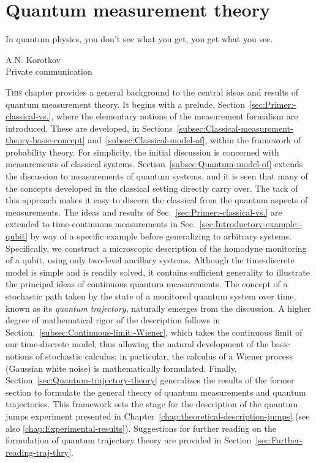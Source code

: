 
\chapter{Quantum measurement theory\label{chap:Quantum-Trajectory-Theory}}


\singlespacing 
\epigraph{
In quantum physics, you don't see what you get, you get what you see.}
{A.N. Korotkov\\Private communication} 
\doublespacing\noindent\lettrine{T}{his} chapter provides a general background
to the central ideas and results of quantum measurement theory. It
begins with a prelude, Section~\ref{sec:Primer:-classical-vs.},
where the elementary notions of the measurement formalism are introduced.
These are developed, in Sections~\ref{subsec:Classical-measurement-theory-basic-concept}
and~\ref{subsec:Classical-model-of}, within the framework of probability
theory. For simplicity, the initial discussion is concerned with measurements
of classical systems. Section~\ref{subsec:Quantum-model-of} extends
the discussion to measurements of quantum systems, and it is seen
that many of the concepts developed in the classical setting directly
carry over. The tack of this approach makes it easy to discern the
classical from the quantum aspects of measurements. The ideas and
results of Sec.~\ref{sec:Primer:-classical-vs.} are extended to
time-continuous measurements in Sec.~\ref{sec:Introductory-example:-qubit}
by way of a specific example before generalizing to arbitrary systems.
Specifically, we construct a microscopic description of the homodyne
monitoring of a qubit, using only two-level ancillary systems. Although
the time-discrete model is simple and is readily solved, it contains
sufficient generality to illustrate the principal ideas of continuous
quantum measurements. The concept of a stochastic path taken by the
state of a monitored quantum system over time, known as its\emph{
quantum trajectory}, naturally emerges from the discussion. A higher
degree of mathematical rigor of the description follows in Section.~\ref{subsec:Continuous-limit:-Wiener},
which takes the continuous limit of our time-discrete model, thus
allowing the natural development of the basic notions of stochastic
calculus; in particular, the calculus of a Wiener process (Gaussian
white noise) is mathematically formulated. Finally, Section~\ref{sec:Quantum-trajectory-theory}
generalizes the results of the former section to formulate the general
theory of quantum measurements and quantum trajectories. This framework
sets the stage for the description of the quantum jumps experiment
presented in Chapter~\ref{chap:theoretical-description-jumps} (see
also \ref{chap:Experimental-results}). Suggestions for further reading
on the formulation of quantum trajectory theory are provided in Section~\ref{sec:Further-reading-traj-thry}.



